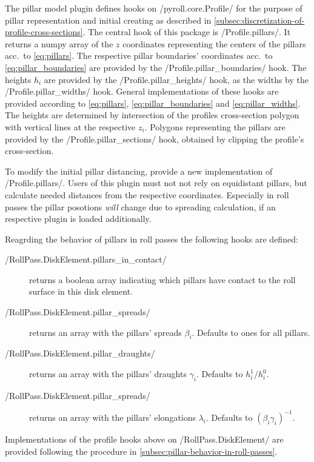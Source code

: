 \documentclass[11pt]{PyRollDocs}
\begin{document}
    The pillar model plugin defines hooks on \py/pyroll.core.Profile/ for the purpose of pillar representation and initial creating as described in \autoref{subsec:discretization-of-profile-cross-sections}.
    The central hook of this package is \py/Profile.pillars/.
    It returns a numpy array of the $z$ coordinates representing the centers of the pillars acc.\ to \autoref{eq:pillars}.
    The respective pillar boundaries' coordinates acc.\ to \autoref{eq:pillar_boundaries}  are provided by the \py/Profile.pillar_boundaries/ hook.
    The heights $h_i$ are provided by the \py/Profile.pillar_heights/ hook, as the widths by the \py/Profile.pillar_widths/ hook.
    General implementations of these hooks are provided according to \autoref{eq:pillars}, \autoref{eq:pillar_boundaries} and \autoref{eq:pillar_widths}.
    The heights are determined by intersection of the profiles cross-section polygon with vertical lines at the respective $z_i$.
    Polygons representing the pillars are provided by the \py/Profile.pillar_sections/ hook, obtained by clipping the profile's cross-section.

    To modify the initial pillar distancing, provide a new implementation of \py/Profile.pillars/.
    Users of this plugin must not not rely on equidistant pillars, but calculate needed distances from the respective coordinates.
    Especially in roll passes the pillar posotions \emph{will} change due to spreading calculation, if an respective plugin is loaded additionally.

    Reagrding the behavior of pillars in roll passes the following hooks are defined:
    \begin{description}
        \item[\py/RollPass.DiskElement.pillars_in_contact/] returns a boolean array indicating which pillars have contact to the roll surface in this disk element.
        \item[\py/RollPass.DiskElement.pillar_spreads/] returns an array with the pillars' spreads $\beta_i$. Defaults to ones for all pillars.
        \item[\py/RollPass.DiskElement.pillar_draughts/] returns an array with the pillars' draughts $\gamma_i$. Defaults to $h_i^1 / h_i^0$.
        \item[\py/RollPass.DiskElement.pillar_spreads/] returns an array with the pillars' elongations $\lambda_i$. Defaults to $(\beta_i\gamma_i)^{-1}$.
    \end{description}

    Implementations of the profile hooks above on \py/RollPass.DiskElement/ are provided following the procedure in \autoref{subsec:pillar-behavior-in-roll-passes}.
\end{document}

